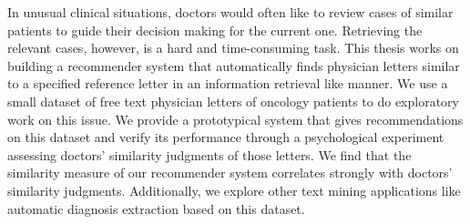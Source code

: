 \documentclass[Thesis.tex]{subfiles}
\begin{document}
\setlength{\parindent}{0cm}
In unusual clinical situations, doctors would often like to review cases of similar patients to guide their decision making for the current one. Retrieving the relevant cases, however, is a hard and time-consuming task. This thesis works on building a recommender system that automatically finds physician letters similar to a specified reference letter in an information retrieval like manner. We use a small dataset of free text physician letters of oncology patients to do exploratory work on this issue. We provide a prototypical system that gives recommendations on this dataset and verify its performance through a psychological experiment assessing doctors' similarity judgments of those letters. We find that the similarity measure of our recommender system correlates strongly with doctors' similarity judgments. Additionally, we explore other text mining applications like automatic diagnosis extraction based on this dataset.
\end{document}
